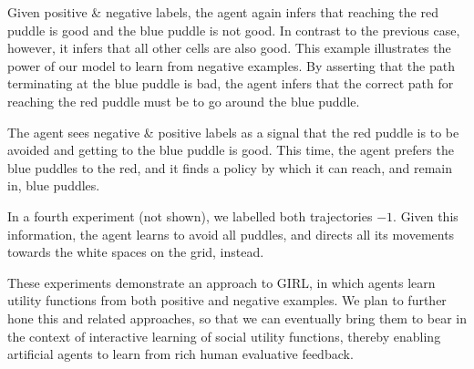 Given positive \& negative labels, the agent again infers that
reaching the red puddle is good and the blue puddle is not good. In
contrast to the previous case, however, it infers that all other cells
are also good. This example illustrates the power of our model to
learn from negative examples. By asserting that the path terminating
at the blue puddle is bad, the agent infers that the correct path for
reaching the red puddle must be to go around the blue puddle.

The agent sees negative \& positive labels as a signal that the red
puddle is to be avoided and getting to the blue puddle is good.  This
time, the agent prefers the blue puddles to the red, and it finds a
policy by which it can reach, and remain in, blue puddles.

In a fourth experiment (not shown), we labelled both trajectories
$-1$.  Given this information, the agent learns to avoid all puddles,
and directs all its movements towards the white spaces on the grid,
instead.

These experiments demonstrate an approach to GIRL, in which agents
learn utility functions from both positive and negative examples.
We plan to further hone this and related approaches, so that we can
eventually bring them to bear in the context of interactive learning
of social utility functions, thereby enabling artificial agents to
learn from rich human evaluative feedback.


